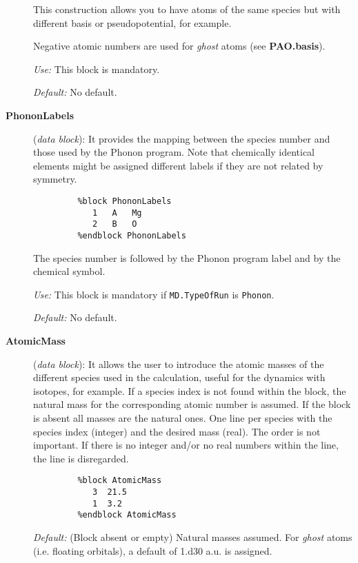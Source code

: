 \documentclass[11pt]{article}
\begin{document}
\begin{description}
This construction allows you to have atoms of the same species but with
different basis or pseudopotential, for example.

Negative atomic numbers are used for {\it ghost} atoms 
(see {\bf PAO.basis}).

{\it Use:} This block is mandatory.

{\it Default:} No default. 

\item[{\bf PhononLabels}] ({\it data block}): 
It provides the mapping 
between the species number and those used by the {\sc
Phonon} program. Note that chemically identical elements might be
assigned different labels if they are not related by symmetry.

\begin{verbatim}
         %block PhononLabels
            1   A   Mg
            2   B   O
         %endblock PhononLabels
\end{verbatim}

The species number is followed by the {\sc
Phonon} program label and by the chemical symbol.

{\it Use:} This block is mandatory if {\tt MD.TypeOfRun} is {\tt Phonon}.

{\it Default:} No default. 



\item[{\bf AtomicMass}] ({\it data block}): 
It allows the user to introduce
the atomic masses of the different species used in the calculation, useful
for the dynamics with isotopes, for example. If
a species index is not found within the block, the natural mass for the 
corresponding atomic number is assumed. If the block is absent all masses
are the natural ones. One line per species with the species index (integer)
and the desired mass (real). The order is not important. If there is no 
integer and/or no real numbers within the line, the line is disregarded.

\begin{verbatim}
         %block AtomicMass
            3  21.5
            1  3.2 
         %endblock AtomicMass
\end{verbatim}

{\it Default:} (Block absent or empty) Natural masses assumed. For 
{\it ghost} atoms (i.e. floating orbitals), a default of 1.d30 a.u. is 
assigned.



\end{description}
\end{document}
